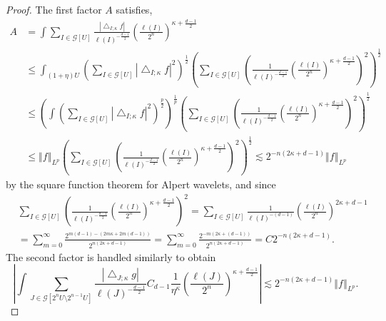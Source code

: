 \documentclass{amsart}%
\theoremstyle{plain}
\numberwithin{equation}{section}
\begin{document}
\begin{proof}
The first factor $A$ satisfies,%
\begin{align*}
A  & =\int\sum_{I\in\mathcal{G}\left[  U\right]  }\frac{\left\vert
\bigtriangleup_{I;\kappa}f\right\vert }{\ell\left(  I\right)  ^{-\frac{d-1}%
{2}}}\left(  \frac{\ell\left(  I\right)  }{2^{n}}\right)  ^{\kappa+\frac
{d-1}{2}}\\
& \leq\int_{\left(  1+\eta\right)  U}\left(  \sum_{I\in\mathcal{G}\left[
U\right]  }\left\vert \bigtriangleup_{I;\kappa}f\right\vert ^{2}\right)
^{\frac{1}{2}}\left(  \sum_{I\in\mathcal{G}\left[  U\right]  }\left(  \frac
{1}{\ell\left(  I\right)  ^{-\frac{d-1}{2}}}\left(  \frac{\ell\left(
I\right)  }{2^{n}}\right)  ^{\kappa+\frac{d-1}{2}}\right)  ^{2}\right)
^{\frac{1}{2}}\\
& \leq\left(  \int\left(  \sum_{I\in\mathcal{G}\left[  U\right]  }\left\vert
\bigtriangleup_{I;\kappa}f\right\vert ^{2}\right)  ^{\frac{p}{2}}\right)
^{\frac{1}{p}}\left(  \sum_{I\in\mathcal{G}\left[  U\right]  }\left(  \frac
{1}{\ell\left(  I\right)  ^{-\frac{d-1}{2}}}\left(  \frac{\ell\left(
I\right)  }{2^{n}}\right)  ^{\kappa+\frac{d-1}{2}}\right)  ^{2}\right)
^{\frac{1}{2}}\\
& \leq\left\Vert f\right\Vert _{L^{p}}\left(  \sum_{I\in\mathcal{G}\left[
U\right]  }\left(  \frac{1}{\ell\left(  I\right)  ^{-\frac{d-1}{2}}}\left(
\frac{\ell\left(  I\right)  }{2^{n}}\right)  ^{\kappa+\frac{d-1}{2}}\right)
^{2}\right)  ^{\frac{1}{2}}\lesssim2^{-n\left(  2\kappa+d-1\right)
}\left\Vert f\right\Vert _{L^{p}}%
\end{align*}
by the square function theorem for Alpert wavelets, and since%
\begin{align*}
& \sum_{I\in\mathcal{G}\left[  U\right]  }\left(  \frac{1}{\ell\left(
I\right)  ^{-\frac{d-1}{2}}}\left(  \frac{\ell\left(  I\right)  }{2^{n}%
}\right)  ^{\kappa+\frac{d-1}{2}}\right)  ^{2}=\sum_{I\in\mathcal{G}\left[
U\right]  }\frac{1}{\ell\left(  I\right)  ^{-\left(  d-1\right)  }}\left(
\frac{\ell\left(  I\right)  }{2^{n}}\right)  ^{2\kappa+d-1}\\
& =\sum_{m=0}^{\infty}\frac{2^{m\left(  d-1\right)  -\left(  2m\kappa
+2m\left(  d-1\right)  \right)  }}{2^{n\left(  2\kappa+d-1\right)  }}%
=\sum_{m=0}^{\infty}\frac{2^{-m\left(  2\kappa+\left(  d-1\right)  \right)  }%
}{2^{n\left(  2\kappa+d-1\right)  }}=C2^{-n\left(  2\kappa+d-1\right)  }.
\end{align*}
The second factor is handled similarly to obtain%
\[
\left\vert \int\sum_{J\in\mathcal{G}\left[  2^{n}U\setminus2^{n-1}U\right]
}\frac{\left\vert \bigtriangleup_{J;\kappa}g\right\vert }{\ell\left(
J\right)  ^{-\frac{d-1}{2}}}C_{d-1}\frac{1}{\eta^{\kappa}}\left(  \frac
{\ell\left(  J\right)  }{2^{n}}\right)  ^{\kappa+\frac{d-1}{2}}\right\vert
\lesssim2^{-n\left(  2\kappa+d-1\right)  }\left\Vert f\right\Vert _{L^{p}}.
\]



\end{proof}
\end{document}
